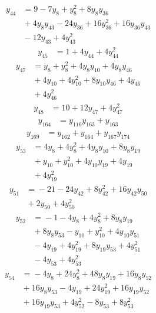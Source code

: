 \begin{align*}
y_{44} &={} 9 -7y_{8} +y_{8}^{2} +8y_{8}y_{36} \\
 &{} +4y_{8}y_{43} -24y_{36} +16y_{36}^{2} +16y_{36}y_{43} \\
 &{} -12y_{43} +4y_{43}^{2}
\end{align*}
\begin{align*}
y_{45} &={} 1 +4y_{44} +4y_{44}^{2}
\end{align*}
\begin{align*}
y_{47} &={} y_{8} +y_{8}^{2} +4y_{8}y_{10} +4y_{8}y_{46} \\
 &{} +4y_{10} +4y_{10}^{2} +8y_{10}y_{46} +4y_{46} \\
 &{} +4y_{46}^{2}
\end{align*}
\begin{align*}
y_{48} &={} 10 +12y_{47} +4y_{47}^{2}
\end{align*}
\begin{align*}
y_{164} &={} y_{116}y_{163} +y_{163}
\end{align*}
\begin{align*}
y_{169} &={} y_{162} +y_{164} +y_{167}y_{174}
\end{align*}
\begin{align*}
y_{53} &={} 4y_{8} +4y_{8}^{2} +4y_{8}y_{10} +8y_{8}y_{19} \\
 &{} +y_{10} +y_{10}^{2} +4y_{10}y_{19} +4y_{19} \\
 &{} +4y_{19}^{2}
\end{align*}
\begin{align*}
y_{51} &={} -21 -24y_{42} +8y_{42}^{2} +16y_{42}y_{50} \\
 &{} +2y_{50} +4y_{50}^{2}
\end{align*}
\begin{align*}
y_{52} &={} -1 -4y_{8} +4y_{8}^{2} +8y_{8}y_{19} \\
 &{} +8y_{8}y_{53} -y_{10} +y_{10}^{2} +4y_{10}y_{51} \\
 &{} -4y_{19} +4y_{19}^{2} +8y_{19}y_{53} +4y_{51}^{2} \\
 &{} -4y_{53} +4y_{53}^{2}
\end{align*}
\begin{align*}
y_{54} &={} -4y_{8} +24y_{8}^{2} +48y_{8}y_{19} +16y_{8}y_{52} \\
 &{} +16y_{8}y_{53} -4y_{19} +24y_{19}^{2} +16y_{19}y_{52} \\
 &{} +16y_{19}y_{53} +4y_{52}^{2} -8y_{53} +8y_{53}^{2}
\end{align*}
